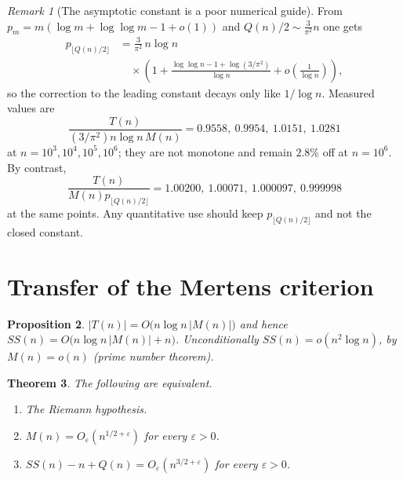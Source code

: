 \documentclass[11pt]{amsart}
\numberwithin{equation}{section}
\theoremstyle{plain}
\newtheorem{theorem}{Theorem}[section]
\newtheorem{proposition}[theorem]{Proposition}
\theoremstyle{definition}
\theoremstyle{remark}
\newtheorem{remark}[theorem]{Remark}
\newcommand{\Mert}{M}
\newcommand{\Sq}{Q}
\begin{document}
\begin{remark}[The asymptotic constant is a poor numerical guide]
\label{rem:prime-scale-data}
From $p_m=m(\log m+\log\log m-1+o(1))$ and $\Sq(n)/2\sim \tfrac3{\pi^2}n$ one
gets
\begin{equation}
\label{eq:prime-scale-expansion}
\begin{aligned}
p_{\lfloor \Sq(n)/2\rfloor}
&=\frac{3}{\pi^2}\,n\log n\\
&\quad\times\left(1+\frac{\log\log n-1+\log(3/\pi^2)}{\log n}
+o\!\left(\tfrac1{\log n}\right)\right),
\end{aligned}
\end{equation}
so the correction to the leading constant decays only like $1/\log n$. Measured
values are
\begin{equation}
\label{eq:leading-scale-data}
\frac{T(n)}{(3/\pi^2)n\log n\,\Mert(n)}
=0.9558,\ 0.9954,\ 1.0151,\ 1.0281
\end{equation}
at $n=10^3,10^4,10^5,10^6$; they are not monotone and remain $2.8\%$ off at
$n=10^6$. By contrast,
\begin{equation}
\label{eq:exact-prime-scale-data}
\frac{T(n)}{\Mert(n)p_{\lfloor \Sq(n)/2\rfloor}}
=1.00200,\ 1.00071,\ 1.000097,\ 0.999998
\end{equation}
at the same points. Any quantitative use should keep
$p_{\lfloor \Sq(n)/2\rfloor}$ and not the closed constant.
\end{remark}

\section{Transfer of the Mertens criterion}
\label{sec:mertens-transfer}

\begin{proposition}
\label{prop:growth}
$|T(n)|=O\bigl(n\log n\,|\Mert(n)|\bigr)$ and hence
$SS(n)=O\bigl(n\log n\,|\Mert(n)|+n\bigr)$. Unconditionally
$SS(n)=o(n^2\log n)$, by $\Mert(n)=o(n)$ (prime number theorem).
\end{proposition}

\begin{theorem}\label{thm:RH}
The following are equivalent.
\begin{enumerate}[label=(\alph*)]
\item The Riemann hypothesis.
\item $\Mert(n)=O_\varepsilon(n^{1/2+\varepsilon})$ for every $\varepsilon>0$.
\item $SS(n)-n+\Sq(n)=O_\varepsilon(n^{3/2+\varepsilon})$ for every
$\varepsilon>0$.
\end{enumerate}
\end{theorem}
\end{document}
